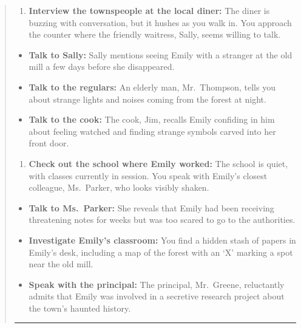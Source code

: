 \documentclass[fleqn,10pt]{wlscirep}
\providecommand{\tightlist}{%
  \setlength{\itemsep}{0pt}\setlength{\parskip}{0pt}}
\begin{document}
\begin{quote}
\begin{enumerate}
\def\labelenumi{\arabic{enumi}.}
\setcounter{enumi}{1}
\tightlist
\item
  \textbf{Interview the townspeople at the local diner:} The diner is
  buzzing with conversation, but it hushes as you walk in. You approach
  the counter where the friendly waitress, Sally, seems willing to talk.
\end{enumerate}

\begin{itemize}
\item
  \textbf{Talk to Sally:} Sally mentions seeing Emily with a stranger at
  the old mill a few days before she disappeared.
\item
  \textbf{Talk to the regulars:} An elderly man, Mr.~Thompson, tells you
  about strange lights and noises coming from the forest at night.
\item
  \textbf{Talk to the cook:} The cook, Jim, recalls Emily confiding in
  him about feeling watched and finding strange symbols carved into her
  front door.
\end{itemize}

\begin{enumerate}
\def\labelenumi{\arabic{enumi}.}
\setcounter{enumi}{2}
\tightlist
\item
  \textbf{Check out the school where Emily worked:} The school is quiet,
  with classes currently in session. You speak with Emily's closest
  colleague, Ms.~Parker, who looks visibly shaken.
\end{enumerate}

\begin{itemize}
\item
  \textbf{Talk to Ms.~Parker:} She reveals that Emily had been receiving
  threatening notes for weeks but was too scared to go to the
  authorities.
\item
  \textbf{Investigate Emily's classroom:} You find a hidden stash of
  papers in Emily's desk, including a map of the forest with an `X'
  marking a spot near the old mill.
\item
  \textbf{Speak with the principal:} The principal, Mr.~Greene,
  reluctantly admits that Emily was involved in a secretive research
  project about the town's haunted history.
\end{itemize}

\begin{center}\rule{0.5\linewidth}{0.5pt}\end{center}


\end{quote}
\end{document}
